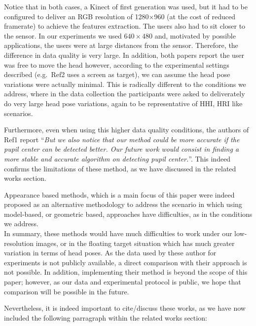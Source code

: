 {Notice that in both cases, a Kinect of first generation was used, but it had to be
configured to deliver an RGB resolution
of 1280$\times$960 (at the cost of reduced framerate) to achieve the features extraction. The users also had to sit closer to the sensor. In our experiments
we used $640\times480$
and, motivated by possible applications, the users were at large distances from the sensor. Therefore, the difference in data quality is very large.
In addition, both papers report the user was free to move the head however, according to the experimental settings described (e.g.~Ref2 uses a screen as target),
we can assume the head pose variations were actually minimal. This is radically different to the conditions we address, where in the data collection
the participants were asked to deliverately do very large head pose variations, again to be representative of HHI, HRI like scenarios.

Furthermore, even when using this higher data quality conditions, the authors of Ref1 report ``{\em But we also notice that our method could be more
accurate if the pupil center can be detected better. Our future
work would consist in finding a more stable and accurate
algorithm on detecting pupil center.}''. This indeed confirms the limitations of these method, as we have discussed in the related works section.

%
%
Appearance based methods, which is a main focus of this paper  were indeed proposed as an alternative methodology to address
the scenario in which using model-based, or geometric based, approaches have difficulties, as in the conditions we address. \\[1mm]
%
%
In summary, these methods would have much difficulties to work under our low-resolution images, or in the floating target situation which has much greater
variation in terms of head poses.
As the data used by these author for experiments is not publicly available, a direct comparison with their approach is not possible.
In addition, implementing their method is beyond the scope of this paper; however, as our data and experimental protocol
is public, we hope that comparison will be possible in the future.

Nevertheless, it is indeed important to cite/discuss these works, as we have now included the following parragraph within the related works section:

}
